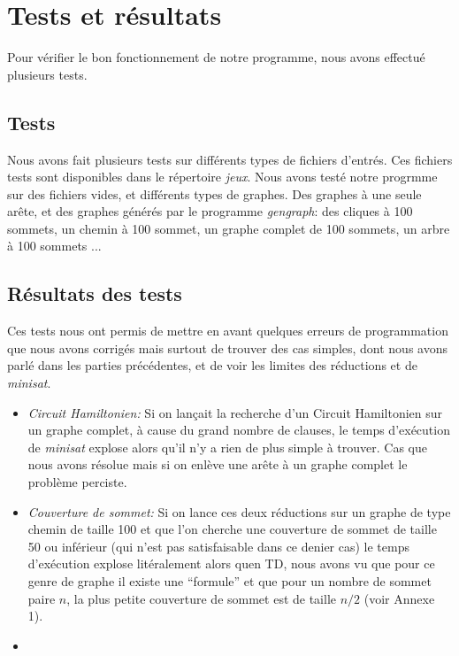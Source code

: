  \section{Tests et résultats}
  Pour vérifier le bon fonctionnement de notre programme, nous avons
  effectué plusieurs tests.
  \subsection{Tests}
  Nous avons fait plusieurs tests sur différents types de fichiers
  d'entrés. Ces fichiers tests sont disponibles dans le répertoire
  \emph{jeux}. Nous avons testé notre progrmme sur des fichiers vides,
  et différents types de graphes. Des graphes à une seule arête, et des
  graphes générés par le programme \emph{gengraph}: des cliques à 100
  sommets, un chemin à 100 sommet, un graphe complet de 100 sommets, un
  arbre à 100 sommets ...
  \subsection{Résultats des tests}
  Ces tests nous ont permis de mettre en avant quelques erreurs de
  programmation que nous avons corrigés mais surtout de trouver des cas
  simples, dont nous avons parlé dans les parties précédentes, et de
  voir les limites des réductions et de \emph{minisat}.\newline
  \begin{itemize}
   \item \emph{Circuit Hamiltonien:} Si on lançait la recherche d'un
	 Circuit Hamiltonien sur un graphe complet, à cause du grand
	 nombre de clauses, le temps d'exécution de \emph{minisat}
	 explose alors qu'il n'y a rien de plus simple à trouver. Cas
	 que nous avons résolue mais si on enlève une arête à un graphe
	 complet le problème perciste.\\
   \item \emph{Couverture de sommet:} Si on lance ces deux
	 réductions sur un graphe de type chemin de taille 100 et que
	 l'on cherche une couverture de sommet de taille 50 ou
	 inférieur (qui n'est pas satisfaisable dans ce denier cas) le
	 temps d'exécution explose litéralement alors quen TD, nous
	 avons vu que pour ce genre de graphe il existe une ``formule''
	 et que pour un nombre de sommet paire $n$, la plus petite
	 couverture de sommet est de taille $n/2$ (voir Annexe 1).
   \item 

  \end{itemize}
